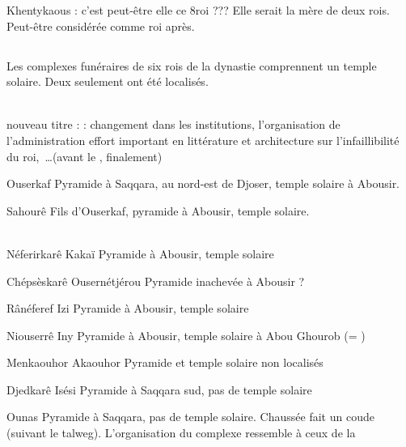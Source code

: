 Khentykaous : c'est peut-être elle ce 8\ieme roi ???
Elle serait la mère de deux rois. Peut-être considérée comme roi après.

\subsection{\texorpdfstring{}{Ve dynastie}}

Les complexes funéraires de six rois de la dynastie comprennent un 
temple solaire. Deux seulement ont été localisés.
                  
\noindent{} \\
nouveau titre :  : changement 
dans les institutions, l'organisation de l'administration \donc{} 
effort important en littérature et architecture sur l'infaillibilité 
du roi,~\dots (avant le \MK, finalement)

\begin{listerois}
  \item [Ouserkaf] Pyramide à Saqqara, au nord-est de Djoser, 
        temple solaire à Abousir.
  \item [Sahourê] Fils d'Ouserkaf, pyramide à Abousir, temple 
        solaire. \\
         \\
  \item [Néferirkarê Kakaï] Pyramide à Abousir, temple solaire
  \item [Chépsèskarê Ousernétjérou] Pyramide inachevée à Abousir ?
  \item [Rânéferef Izi] Pyramide à Abousir, temple solaire
  \item [Niouserrê Iny] Pyramide à Abousir, temple solaire à 
        Abou Ghourob (= )
  \item [Menkaouhor Akaouhor] Pyramide et temple solaire non localisés
  \item [Djedkarê Isési] Pyramide à Saqqara sud, pas de temple solaire
  \item [Ounas] Pyramide à Saqqara, pas de temple solaire. Chaussée 
        fait un coude (suivant le talweg). L'organisation du complexe 
        ressemble à ceux de la  \\
\end{listerois}

